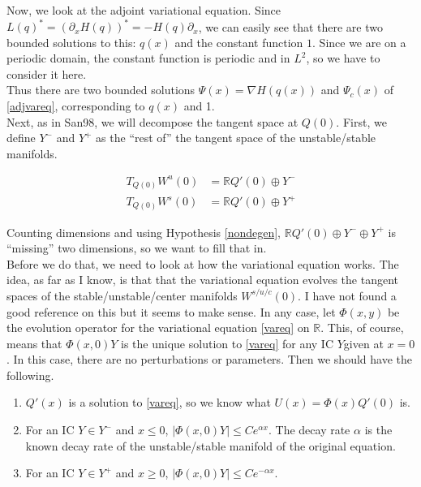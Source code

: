 \documentclass[12pt]{article}
\def\R{{\mathbb R}}
\begin{document}
Now, we look at the adjoint variational equation. Since $L(q)^* = (\partial_x H(q))^* = -H(q) \partial_x$, we can easily see that there are two bounded solutions to this: $q(x)$ and the constant function $1$. Since we are on a periodic domain, the constant function is periodic and in $L^2$, so we have to consider it here.\\

Thus there are two bounded solutions $\Psi(x) = \nabla H(q(x))$ and $\Psi_c(x)$ of \eqref{adjvareq}, corresponding to $q(x)$ and 1.\\

Next, as in San98, we will decompose the tangent space at $Q(0)$. First, we define $Y^-$ and $Y^+$ as the ``rest of'' the tangent space of the unstable/stable manifolds.

\begin{align*}
T_{Q(0)} W^u(0) &= \R Q'(0) \oplus Y^- \\
T_{Q(0)} W^s(0) &= \R Q'(0) \oplus Y^+
\end{align*}

Counting dimensions and using Hypothesis \ref{nondegen}, $\R Q'(0) \oplus Y^- \oplus Y^+$ is ``missing'' two dimensions, so we want to fill that in.\\

Before we do that, we need to look at how the variational equation works. The idea, as far as I know, is that that the variational equation evolves the tangent spaces of the stable/unstable/center manifolds $W^{s/u/c}(0)$. I have not found a good reference on this but it seems to make sense. In any case, let $\Phi(x, y)$ be the evolution operator for the variational equation \eqref{vareq} on $\R$. This, of course, means that $\Phi(x, 0)Y$ is the unique solution to \eqref{vareq} for any IC $Y$given at $x = 0$. In this case, there are no perturbations or parameters. Then we should have the following.

\begin{enumerate}
	\item $Q'(x)$ is a solution to \eqref{vareq}, so we know what $U(x) = \Phi(x)Q'(0)$ is.
	\item For an IC $Y \in Y^-$ and $x \leq 0$, $|\Phi(x, 0) Y| \leq C e^{\alpha x}$. The decay rate $\alpha$ is the known decay rate of the unstable/stable manifold of the original equation.
	\item For an IC $Y \in Y^+$ and $x \geq 0$, $|\Phi(x, 0) Y| \leq C e^{-\alpha x}$. 
\end{enumerate}
\end{document}
